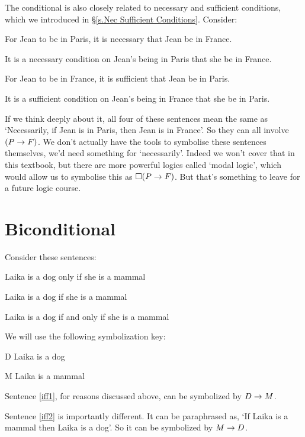 The conditional is also closely related to necessary and sufficient conditions, which we introduced in \S\ref{s.Nec Sufficient Conditions}.  Consider:
	\begin{earg}
		\item[\ex{ifnec1}] For Jean to be in Paris, it is necessary that Jean be in France.
		\item[\ex{ifnec2}] It is a necessary condition on Jean's being in Paris that she be in France. 
		\item[\ex{ifsuf1}] For Jean to be in France, it is sufficient that Jean be in Paris.
		\item[\ex{ifsuf2}] It is a sufficient condition on Jean's being in France that she be in Paris.
	\end{earg}
If we think deeply about it, all four of these sentences mean the same as  `Necessarily, if Jean is in Paris, then Jean is in France'. So they can all involve $(P \rightarrow F)$. We don't actually have the tools to symbolise these sentences themselves, we'd need something for `necessarily'. Indeed we won't cover that in this textbook, but there are more powerful logics called `modal logic', which would allow us to symbolise this as $\square (P\rightarrow F)$. But that's something to leave for a future logic course.



\section{Biconditional}
Consider these sentences:
	\begin{earg}
		\item[\ex{iff1}] Laika is a dog only if she is a mammal
		\item[\ex{iff2}] Laika is a dog if she is a mammal
		\item[\ex{iff3}] Laika is a dog if and only if she is a mammal
	\end{earg}
We will use the following symbolization key:
	\begin{ekey}
		\item[D] Laika is a dog
		\item[M] Laika is a mammal
	\end{ekey}
Sentence \ref{iff1}, for reasons discussed above, can be symbolized by $D \rightarrow M$.

Sentence \ref{iff2} is importantly different. It can be paraphrased as, `If Laika is a mammal then Laika is a dog'. So it can be symbolized by $M \rightarrow D$.


